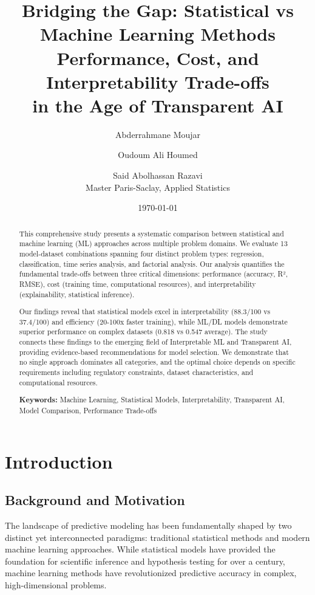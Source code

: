\documentclass[11pt,a4paper]{article}
\title{Bridging the Gap: Statistical vs Machine Learning Methods\\
\large Performance, Cost, and Interpretability Trade-offs\\
\large in the Age of Transparent AI}
\author{Abderrahmane Moujar \and Oudoum Ali Houmed \and Said Abolhassan Razavi\\
\small Master Paris-Saclay, Applied Statistics}
\date{\today}
\begin{document}
\maketitle

\begin{abstract}
This comprehensive study presents a systematic comparison between statistical and machine learning (ML) approaches across multiple problem domains. We evaluate 13 model-dataset combinations spanning four distinct problem types: regression, classification, time series analysis, and factorial analysis. Our analysis quantifies the fundamental trade-offs between three critical dimensions: \textcolor{mlcolor}{performance} (accuracy, R², RMSE), \textcolor{statcolor}{cost} (training time, computational resources), and \textcolor{accentcolor}{interpretability} (explainability, statistical inference). 

Our findings reveal that statistical models excel in interpretability (88.3/100 vs 37.4/100) and efficiency (20-100x faster training), while ML/DL models demonstrate superior performance on complex datasets (0.818 vs 0.547 average). The study connects these findings to the emerging field of Interpretable ML and Transparent AI, providing evidence-based recommendations for model selection. We demonstrate that no single approach dominates all categories, and the optimal choice depends on specific requirements including regulatory constraints, dataset characteristics, and computational resources.

\textbf{Keywords:} Machine Learning, Statistical Models, Interpretability, Transparent AI, Model Comparison, Performance Trade-offs
\end{abstract}

\tableofcontents
\newpage

\section{Introduction}

\subsection{Background and Motivation}

The landscape of predictive modeling has been fundamentally shaped by two distinct yet interconnected paradigms: traditional statistical methods and modern machine learning approaches. While statistical models have provided the foundation for scientific inference and hypothesis testing for over a century, machine learning methods have revolutionized predictive accuracy in complex, high-dimensional problems.
\end{document}

